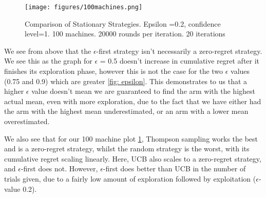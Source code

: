\begin{figure}
    \centering
    \texttt{[image: figures/100machines.png]}
    \caption[Comparison for 100 machines]{Comparison of Stationary Strategies. Epsilon =0.2, confidence level=1. 100 machines. 20000 rounds per iteration. 20 iterations}
    \label{fig: all4}
\end{figure}

We see from above that the $\epsilon$-first strategy isn't necessarily a zero-regret strategy. We see this as the graph for $\epsilon$ = 0.5 doesn't increase in cumulative regret after it finishes its exploration phase, however this is not the case for the two $\epsilon$ values (0.75 and 0.9) which are greater \ref{fig: epsilon}. This demonstrates to us that a higher $\epsilon$ value doesn't mean we are guaranteed to find the arm with the highest actual mean, even with more exploration, due to the fact that we have either had the arm with the highest mean underestimated, or an arm with a lower mean overestimated.

We also see that for our 100 machine plot \ref{fig: all4}, Thompson sampling works the best and is a zero-regret strategy, whilst the random strategy is the worst, with its cumulative regret scaling linearly. Here, UCB also scales to a zero-regret strategy, and $\epsilon$-first does not. However, $\epsilon$-first does better than UCB in the number of trials given, due to a fairly low amount of exploration followed by exploitation ($\epsilon$-value 0.2).